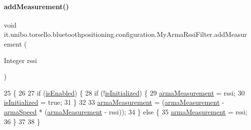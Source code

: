 \paragraph{\texorpdfstring{add\+Measurement()}{addMeasurement()}}
{\footnotesize\ttfamily void it.\+unibo.\+torsello.\+bluetoothpositioning.\+configuration.\+My\+Arma\+Rssi\+Filter.\+add\+Measurement (\begin{DoxyParamCaption}\item[{Integer}]{rssi }\end{DoxyParamCaption})}


\begin{DoxyCode}
25                                              \{
26 
27         \textcolor{keywordflow}{if} (\hyperlink{classit_1_1unibo_1_1torsello_1_1bluetoothpositioning_1_1configuration_1_1MyArmaRssiFilter_a7a046687ef0d8dd63307cabfbb33fcf8_a7a046687ef0d8dd63307cabfbb33fcf8}{isEnabled}) \{
28             \textcolor{keywordflow}{if} (!\hyperlink{classit_1_1unibo_1_1torsello_1_1bluetoothpositioning_1_1configuration_1_1MyArmaRssiFilter_a01cc7f81fd8e0ca8ed3c197d9fc1fd11_a01cc7f81fd8e0ca8ed3c197d9fc1fd11}{isInitialized}) \{
29                 \hyperlink{classit_1_1unibo_1_1torsello_1_1bluetoothpositioning_1_1configuration_1_1MyArmaRssiFilter_a2be11d7395143321b8f2063afe14a8d0_a2be11d7395143321b8f2063afe14a8d0}{armaMeasurement} = rssi;
30                 \hyperlink{classit_1_1unibo_1_1torsello_1_1bluetoothpositioning_1_1configuration_1_1MyArmaRssiFilter_a01cc7f81fd8e0ca8ed3c197d9fc1fd11_a01cc7f81fd8e0ca8ed3c197d9fc1fd11}{isInitialized} = \textcolor{keyword}{true};
31             \}
32 
33             \hyperlink{classit_1_1unibo_1_1torsello_1_1bluetoothpositioning_1_1configuration_1_1MyArmaRssiFilter_a2be11d7395143321b8f2063afe14a8d0_a2be11d7395143321b8f2063afe14a8d0}{armaMeasurement} = (\hyperlink{classit_1_1unibo_1_1torsello_1_1bluetoothpositioning_1_1configuration_1_1MyArmaRssiFilter_a2be11d7395143321b8f2063afe14a8d0_a2be11d7395143321b8f2063afe14a8d0}{armaMeasurement} - 
      \hyperlink{classit_1_1unibo_1_1torsello_1_1bluetoothpositioning_1_1configuration_1_1MyArmaRssiFilter_a5332b55e26b28536d1f8c7cae5e684b4_a5332b55e26b28536d1f8c7cae5e684b4}{armaSpeed} * (\hyperlink{classit_1_1unibo_1_1torsello_1_1bluetoothpositioning_1_1configuration_1_1MyArmaRssiFilter_a2be11d7395143321b8f2063afe14a8d0_a2be11d7395143321b8f2063afe14a8d0}{armaMeasurement} - rssi));
34         \} \textcolor{keywordflow}{else} \{
35             \hyperlink{classit_1_1unibo_1_1torsello_1_1bluetoothpositioning_1_1configuration_1_1MyArmaRssiFilter_a2be11d7395143321b8f2063afe14a8d0_a2be11d7395143321b8f2063afe14a8d0}{armaMeasurement} = rssi;
36         \}
37 
38     \}
\end{DoxyCode}
